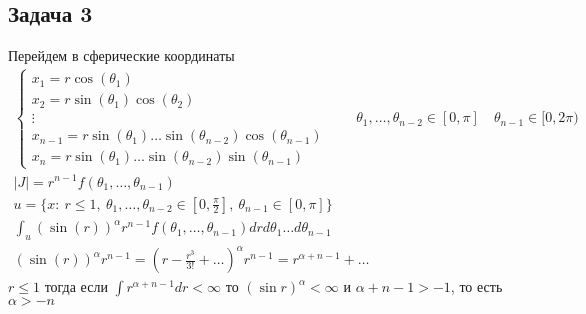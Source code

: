 \subsection*{Задача 3}
	Перейдем в сферические координаты
	\begin{gather*}
	\begin{cases}
		x_1 = r \cos(\theta_1)\\
		x_2 = r \sin(\theta_1) \cos(\theta_2)\\
		\vdots\\
		x_{n-1} = r \sin(\theta_1) \ldots \sin(\theta_{n-2}) \cos(\theta_{n-1})\\
		x_n = r \sin(\theta_1) \ldots \sin(\theta_{n-2}) \sin(\theta_{n-1})
	\end{cases}
	\qquad \theta_1,\ldots,\theta_{n-2} \in [0,\pi]\quad \theta_{n-1} \in [0,2\pi)\\
	|J| = r^{n-1} f(\theta_1,\ldots, \theta_{n-1})\\
	u = \{x:\ r \leqslant 1,\ \theta_1,\ldots,\theta_{n-2} \in [0, \frac{\pi}{2}],\ \theta_{n-1} \in [0, \pi]\}\\
	\int_{u}(\sin(r))^{\alpha} r^{n-1} f(\theta_1,\ldots,\theta_{n-1}) dr d\theta_1 \ldots d\theta_{n-1}\\
	(\sin(r))^{\alpha} r^{n-1} = \left(r - \frac{r^3}{3!} + \ldots \right)^{\alpha} r^{n-1} = r^{\alpha + n - 1} + \ldots
	\end{gather*}
	$r \leqslant 1$ тогда если $\int r^{\alpha + n - 1} dr < \infty$ то $(\sin r)^{\alpha} < \infty$ и $\alpha + n - 1 > -1$, то есть $\alpha > -n$
\vskip 0.4in


